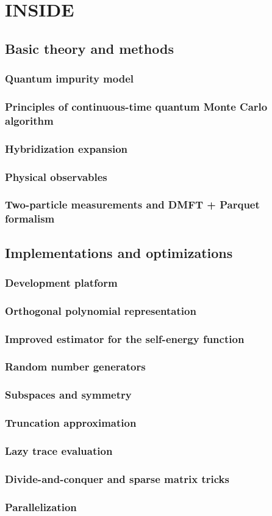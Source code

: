 \chapter{INSIDE {\iqist}}
\section{Basic theory and methods}
\subsection{Quantum impurity model}
\subsection{Principles of continuous-time quantum Monte Carlo algorithm}
\subsection{Hybridization expansion}
\subsection{Physical observables}
\subsection{Two-particle measurements and DMFT + Parquet formalism}
\section{Implementations and optimizations}
\subsection{Development platform}
\subsection{Orthogonal polynomial representation}
\subsection{Improved estimator for the self-energy function}
\subsection{Random number generators}
\subsection{Subspaces and symmetry}
\subsection{Truncation approximation}
\subsection{Lazy trace evaluation}
\subsection{Divide-and-conquer and sparse matrix tricks}
\subsection{Parallelization}
